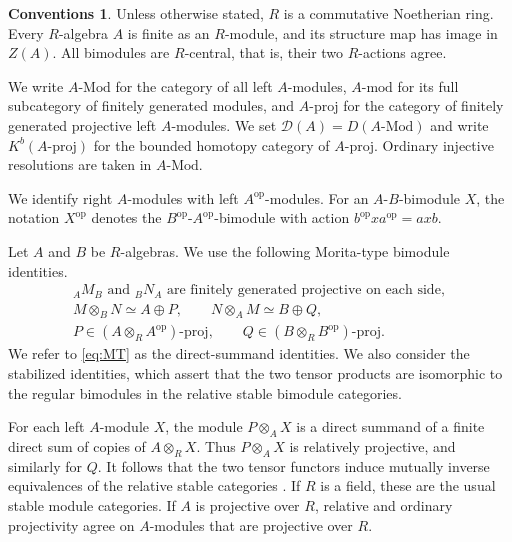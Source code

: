 \documentclass[12pt,a4paper,english,reqno]{amsart}
\numberwithin{equation}{section}
\theoremstyle{plain}
\theoremstyle{definition}
\newtheorem*{convention}{Conventions}
\begin{document}
\begin{convention}
Unless otherwise stated, $R$ is a commutative Noetherian ring.
Every $R$-algebra $A$ is finite as an $R$-module, and its
structure map has image in $Z(A)$. All bimodules are $R$-central,
that is, their two $R$-actions agree.

We write $A\text{-}\mathrm{Mod}$ for the category of all left
$A$-modules, $A\text{-}\mathrm{mod}$ for its full subcategory of
finitely generated modules, and $A\text{-}\mathrm{proj}$ for
the category of finitely generated projective left $A$-modules.
We set $\mathcal D(A)=D(A\text{-}\mathrm{Mod})$ and write
$K^b(A\text{-}\mathrm{proj})$ for the bounded homotopy category
of $A\text{-}\mathrm{proj}$. Ordinary injective resolutions
are taken in $A\text{-}\mathrm{Mod}$.

We identify right $A$-modules with left $A^{\mathrm{op}}$-modules.
For an $A$-$B$-bimodule $X$, the notation $X^{\mathrm{op}}$
denotes the $B^{\mathrm{op}}$-$A^{\mathrm{op}}$-bimodule with
action $b^{\mathrm{op}}xa^{\mathrm{op}}=axb$.
\end{convention}

Let $A$ and $B$ be $R$-algebras. We use the following Morita-type
bimodule identities.
\begin{equation}
\begin{gathered}
 {}_AM_B\text{ and }{}_BN_A\text{ are finitely generated projective
 on each side},\\
 M\otimes_BN\simeq A\oplus P,\qquad
 N\otimes_AM\simeq B\oplus Q,\\
 P\in (A\otimes_RA^{\mathrm{op}})\text{-}\mathrm{proj},\qquad
 Q\in (B\otimes_RB^{\mathrm{op}})\text{-}\mathrm{proj}.
\end{gathered}
\tag{MT}\label{eq:MT}
\end{equation}
 We refer to \eqref{eq:MT} as the
direct-summand identities. We also consider the stabilized identities,
which assert that the two tensor products are isomorphic to the regular
bimodules in the relative stable bimodule categories.

For each left $A$-module $X$, the module $P\otimes_AX$ is a direct
summand of a finite direct sum of copies of $A\otimes_RX$. Thus
$P\otimes_AX$ is relatively projective, and similarly for $Q$.
It follows that the two tensor functors induce mutually inverse
equivalences of the relative stable categories
\cite{RouquierZimmermann2003,Linckelmann2025}. If $R$ is a field, these
are the usual stable module categories. If $A$ is projective over $R$,
relative and ordinary projectivity agree on $A$-modules that are
projective over $R$.
\end{document}
